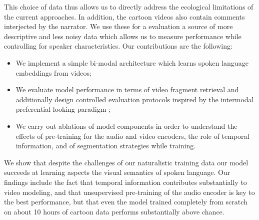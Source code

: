 This choice of data thus allows us to
directly address the ecological limitations of the current
approaches. In addition, the cartoon videos also contain comments
interjected by the narrator. We use these for a evaluation a source of
more descriptive and less noisy data which allows us to measure
performance while controlling for speaker characteristics.
Our contributions are the following:
\begin{itemize}
\item We implement a simple bi-modal architecture which learns
  spoken language embeddings from videos;
\item We evaluate model performance in terms of video fragment
  retrieval and additionally design controlled evaluation
  protocols inspired by the intermodal preferential looking
  paradigm \citep{hirsh1996intermodal};
\item We carry out ablations of model components in order to
  understand the effects of pre-training for the audio and video
  encoders, the role of temporal information, and of segmentation
  strategies while training. 
\end{itemize}
We show that despite the challenges of our naturalistic training data
our model succeeds at learning aspects the visual semantics of spoken
language. Our findings include the fact that temporal information
contributes substantially to video modeling, and that unsupervised
pre-training of the audio encoder is key to the best performance, but that
even the model trained completely from scratch on about 10 hours of
cartoon data performs substantially above chance.




